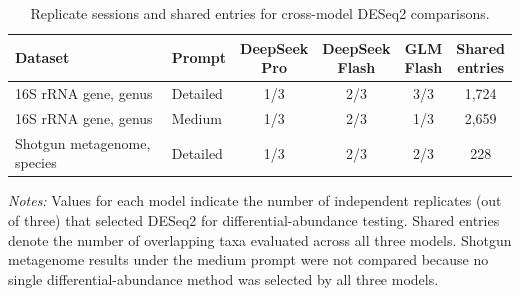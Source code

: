 \documentclass[10pt,letterpaper]{article}
\begin{document}
\FloatBarrier

\begin{table}[htbp]
  \centering
  \caption{Replicate sessions and shared entries for cross-model DESeq2 comparisons.}
  \label{tab:da-model-methods}
  \scriptsize
  \setlength{\tabcolsep}{4pt}
  \renewcommand{\arraystretch}{1.18}
  \begin{tabularx}{\linewidth}{@{}>{\raggedright\arraybackslash}Xlcccc@{}}
    \toprule
    Dataset & Prompt
      & \shortstack{DeepSeek\\Pro}
      & \shortstack{DeepSeek\\Flash}
      & \shortstack{GLM\\Flash}
      & \shortstack{Shared\\entries} \\
    \midrule
    16S rRNA gene, genus       & Detailed & 1/3 & 2/3 & 3/3 & 1,724 \\
    16S rRNA gene, genus       & Medium   & 1/3 & 2/3 & 1/3 & 2,659 \\
    Shotgun metagenome, species & Detailed & 1/3 & 2/3 & 2/3 & 228 \\
    \bottomrule
  \end{tabularx}
  \vspace{0.35em}
  \begin{minipage}{\linewidth}
    \footnotesize
    \textit{Notes:} Values for each model indicate the number of independent replicates
    (out of three) that selected DESeq2 for differential-abundance testing.
    Shared entries denote the number of overlapping taxa evaluated across all three models.
    Shotgun metagenome results under the medium prompt were not compared because no
    single differential-abundance method was selected by all three models.
  \end{minipage}
\end{table}
\end{document}
